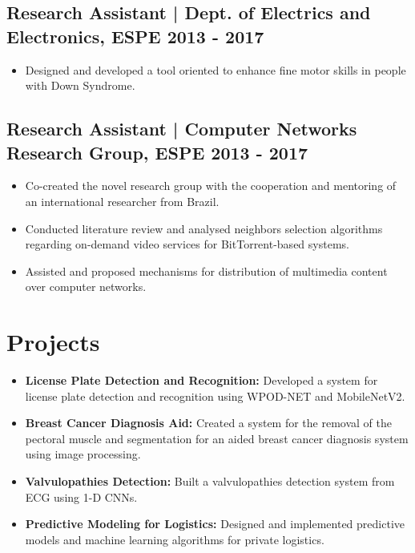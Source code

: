 \documentclass[11pt,a4paper]{article}
\begin{document}
\vspace{0.5em}
\subsection*{Research Assistant | Dept. of Electrics and Electronics, ESPE \hfill 2013 - 2017}
\begin{itemize}
    \item Designed and developed a tool oriented to enhance fine motor skills in people with Down Syndrome.
\end{itemize}

\vspace{0.5em}
\subsection*{Research Assistant | Computer Networks Research Group, ESPE \hfill 2013 - 2017}
\begin{itemize}
    \item Co-created the novel research group with the cooperation and mentoring of an international researcher from Brazil.
    \item Conducted literature review and analysed neighbors selection algorithms regarding on-demand video services for BitTorrent-based systems.
    \item Assisted and proposed mechanisms for distribution of multimedia content over computer networks.
\end{itemize}


\section*{Projects}
\begin{itemize}
    \item \textbf{License Plate Detection and Recognition:} Developed a system for license plate detection and recognition using WPOD-NET and MobileNetV2.
    \item \textbf{Breast Cancer Diagnosis Aid:} Created a system for the removal of the pectoral muscle and segmentation for an aided breast cancer diagnosis system using image processing.
    \item \textbf{Valvulopathies Detection:} Built a valvulopathies detection system from ECG using 1-D CNNs.
    \item \textbf{Predictive Modeling for Logistics:} Designed and implemented predictive models and machine learning algorithms for private logistics.
\end{itemize}
\end{document}
